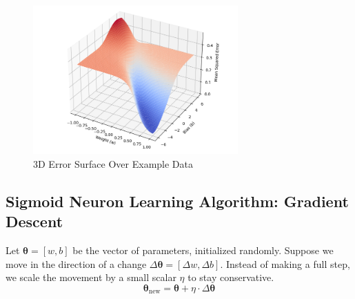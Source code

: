 \begin{figure}[h!]
    \centering
    \includegraphics[width=0.7\textwidth]{content/section01/chapter01/figs/error_surface_sample.png}
    \caption{3D Error Surface Over Example Data}
    \label{fig:3d_error_example}
\end{figure}


\subsection{Sigmoid Neuron Learning Algorithm: Gradient Descent}

Let \( \boldsymbol{\theta} = [w, b] \) be the vector of parameters, initialized randomly. Suppose we move in the direction of a change \( \Delta \boldsymbol{\theta} = [\Delta w, \Delta b] \). Instead of making a full step, we scale the movement by a small scalar \( \eta \) to stay conservative. 
\[
\boldsymbol{\theta}_{\text{new}} = \boldsymbol{\theta} + \eta \cdot \Delta \boldsymbol{\theta}
\]

